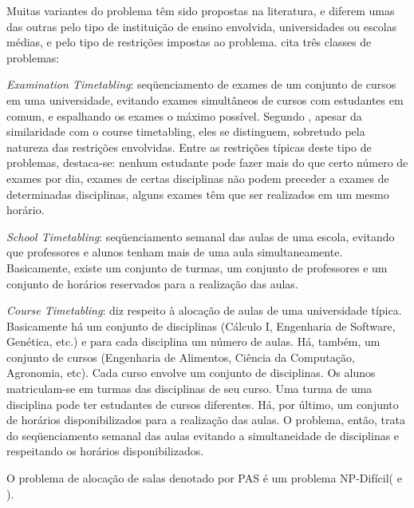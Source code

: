 


\cite{souca(2000)}Muitas variantes do problema têm sido propostas na literatura, e diferem umas das outras pelo tipo de instituição de ensino envolvida, universidades ou escolas médias, e pelo tipo de restrições impostas ao problema. \cite{Schaerf (1999)} cita três classes de problemas:


\textit{Examination Timetabling}: seqüenciamento de exames de um conjunto de cursos em uma universidade, evitando exames simultâneos de cursos com estudantes em comum, e espalhando os exames o máximo possível. Segundo \cite{Souza (2000)}, apesar da similaridade com o course timetabling, eles se distinguem, sobretudo pela natureza das restrições envolvidas. Entre as restrições típicas deste tipo de problemas, destaca-se: nenhum estudante pode fazer mais do que certo número de exames por dia, exames de certas disciplinas não podem preceder a exames de determinadas disciplinas, alguns exames têm que ser realizados em um mesmo horário.\par

\textit{School Timetabling}: seqüenciamento semanal das aulas de uma escola, evitando que professores e alunos tenham mais de uma aula simultaneamente. Basicamente, existe um conjunto de turmas, um conjunto de professores e um conjunto de horários reservados para a realização das aulas.\par

\textit{Course Timetabling}: diz respeito à alocação de aulas de uma universidade típica. Basicamente há um conjunto de disciplinas (Cálculo I, Engenharia de Software, Genética, etc.) e para cada disciplina um número de aulas. Há, também, um conjunto de cursos (Engenharia de Alimentos, Ciência da Computação, Agronomia, etc). Cada curso envolve um conjunto de disciplinas. Os alunos matriculam-se em turmas das disciplinas de seu curso. Uma turma de uma disciplina pode ter estudantes de cursos diferentes. Há, por último, um conjunto de horários disponibilizados para a realização das aulas. O problema, então, trata do seqüenciamento semanal das aulas evitando a simultaneidade de disciplinas e respeitando os horários disponibilizados.\par


O problema de alocação de salas denotado por PAS é um problema NP-Difícil(\cite{Even et al. 1976} e \cite{Carter 1992}).\par

